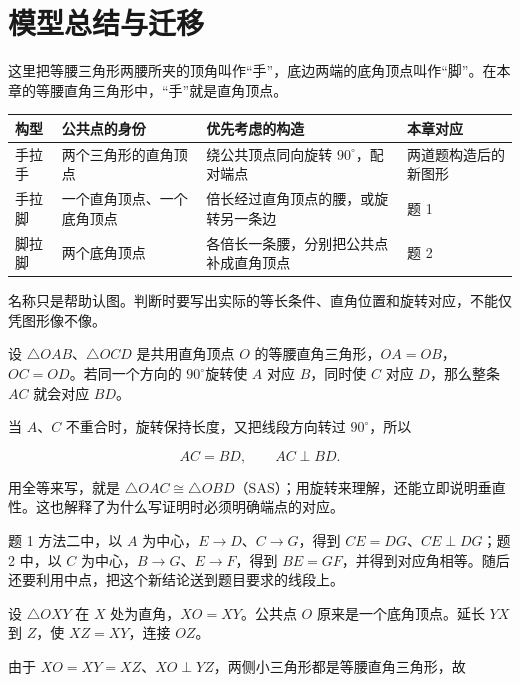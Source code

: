 \section{模型总结与迁移}
\ifteachernotes
{}

这里把等腰三角形两腰所夹的顶角叫作“手”，底边两端的底角顶点叫作“脚”。在本章的等腰直角三角形中，“手”就是直角顶点。

{\small\renewcommand{\arraystretch}{1.25}
\begin{tabularx}{\linewidth}{@{}p{1.2cm} X X p{2cm}@{}}
\toprule
构型 & 公共点的身份 & 优先考虑的构造 & 本章对应 \\
\midrule
手拉手 & 两个三角形的直角顶点 & 绕公共顶点同向旋转 \(90^\circ\)，配对端点 & 两道题构造后的新图形 \\
手拉脚 & 一个直角顶点、一个底角顶点 & 倍长经过直角顶点的腰，或旋转另一条边 & 题 1 \\
脚拉脚 & 两个底角顶点 & 各倍长一条腰，分别把公共点补成直角顶点 & 题 2 \\
\bottomrule
\end{tabularx}}

名称只是帮助认图。判断时要写出实际的等长条件、直角位置和旋转对应，不能仅凭图形像不像。


设 \(\triangle OAB\)、\(\triangle OCD\) 是共用直角顶点 \(O\) 的等腰直角三角形，\(OA=OB\)，\(OC=OD\)。若同一个方向的 \(90^\circ\)旋转使 \(A\) 对应 \(B\)，同时使 \(C\) 对应 \(D\)，那么整条 \(AC\) 就会对应 \(BD\)。

当 \(A\)、\(C\) 不重合时，旋转保持长度，又把线段方向转过 \(90^\circ\)，所以

\[
AC=BD,\qquad AC\perp BD.
\]

用全等来写，就是 \(\triangle OAC\cong \triangle OBD\)（\(\mathrm{SAS}\)）；用旋转来理解，还能立即说明垂直性。这也解释了为什么写证明时必须明确端点的对应。

题 1 方法二中，以 \(A\) 为中心，\(E\to D\)、\(C\to G\)，得到 \(CE=DG\)、\(CE\perp DG\)；题 2 中，以 \(C\) 为中心，\(B\to G\)、\(E\to F\)，得到 \(BE=GF\)，并得到对应角相等。随后还要利用中点，把这个新结论送到题目要求的线段上。


设 \(\triangle OXY\) 在 \(X\) 处为直角，\(XO=XY\)。公共点 \(O\) 原来是一个底角顶点。延长 \(YX\) 到 \(Z\)，使 \(XZ=XY\)，连接 \(OZ\)。

由于 \(XO=XY=XZ\)、\(XO\perp YZ\)，两侧小三角形都是等腰直角三角形，故


